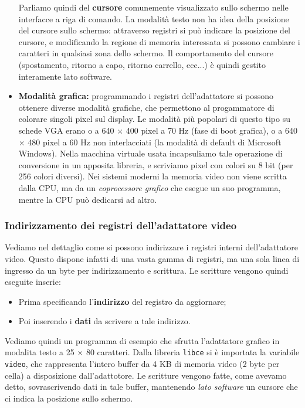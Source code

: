 \documentclass[a4paper,11pt]{article}
\begin{document}
\begin{itemize}
		Parliamo quindi del \textbf{cursore} comunemente visualizzato sullo schermo nelle interfacce a riga di comando.
		La modalità testo non ha idea della posizione del cursore sullo schermo: attraverso registri si può indicare la posizione del cursore, e modificando la regione di memoria interessata si possono cambiare i caratteri in qualsiasi zona dello schermo.
		Il comportamento del cursore (spostamento, ritorno a capo, ritorno carrello, ecc...) è quindi gestito interamente lato software.
	\item \textbf{Modalità grafica:} programmando i registri dell'adattatore si possono ottenere diverse modalità grafiche, che permettono al progammatore di colorare singoli pixel sul display.
		Le modalità più popolari di questo tipo su schede VGA erano o a 640 $\times$ 400 pixel a 70 Hz (fase di boot grafica), o a 640 $\times$ 480 pixel a 60 Hz non interlacciati (la modalità di default di Microsoft Windows). 
	Nella macchina virtuale usata incapsuliamo tale operazione di conversione in un apposita libreria, e scriviamo pixel con colori su 8 bit (per 256 colori diversi).
	Nei sistemi moderni la memoria video non viene scritta dalla CPU, ma da un \textit{coprocessore grafico} che esegue un suo programma, mentre la CPU può dedicarsi ad altro.	
\end{itemize}

\subsubsection{Indirizzamento dei registri dell'adattatore video}
Vediamo nel dettaglio come si possono indirizzare i registri interni dell'adattatore video.
Questo dispone infatti di una vasta gamma di registri, ma una sola linea di ingresso da un byte per indirizzamento e scrittura.
Le scritture vengono quindi eseguite inserie:
\begin{itemize}
	\item Prima specificando l'\textbf{indirizzo} del registro da aggiornare;
	\item Poi inserendo i \textbf{dati} da scrivere a tale indirizzo.
\end{itemize}

\par\smallskip

Vediamo quindi un programma di esempio che sfrutta l'adattatore grafico in modalita testo a 25 $\times$ 80 caratteri.
Dalla libreria \lstinline|libce| si è importata la variabile \lstinline|video|, che rappresenta l'intero buffer da 4 KB di memoria video (2 byte per cella) a disposizione dall'adattotore.
Le scritture vengono fatte, come avevamo detto, sovrascrivendo dati in tale buffer, mantenendo \textit{lato software} un cursore che ci indica la posizione sullo schermo.
\end{document}
